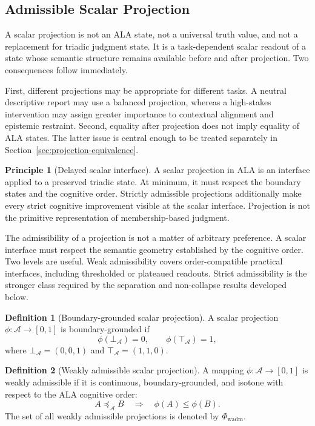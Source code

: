 \documentclass[reqno,final]{amsart}
\theoremstyle{definition}
\newtheorem{definition}{Definition}
\newtheorem{principle}{Principle}
\theoremstyle{plain}
\theoremstyle{remark}
\providecommand{\cA}{\mathcal{A}}
\providecommand{\cPhi}{\Phi}
\providecommand{\preceqA}{\preceq_{\mathcal A}}
\begin{document}
\subsection{Admissible Scalar Projection}
A scalar projection is not an ALA state, not a universal truth value, and not a replacement for triadic judgment state. It is a task-dependent scalar readout of a state whose semantic structure remains available before and after projection. Two consequences follow immediately.

First, different projections may be appropriate for different tasks. A neutral descriptive report may use a balanced projection, whereas a high-stakes intervention may assign greater importance to contextual alignment and epistemic restraint. Second, equality after projection does not imply equality of ALA states. The latter issue is central enough to be treated separately in Section~\ref{sec:projection-equivalence}.

\begin{principle}[Delayed scalar interface]
A scalar projection in ALA is an interface applied to a preserved triadic state. At minimum, it must respect the boundary states and the cognitive order. Strictly admissible projections additionally make every strict cognitive improvement visible at the scalar interface. Projection is not the primitive representation of membership-based judgment.
\end{principle}

The admissibility of a projection is not a matter of arbitrary preference. A scalar interface must respect the semantic geometry established by the cognitive order. Two levels are useful. Weak admissibility covers order-compatible practical interfaces, including thresholded or plateaued readouts. Strict admissibility is the stronger class required by the separation and non-collapse results developed below.

\begin{definition}[Boundary-grounded scalar projection]
A scalar projection \(\phi:\cA\to[0,1]\) is boundary-grounded if
\[
\phi(\bot_{\cA})=0,
\qquad
\phi(\top_{\cA})=1,
\]
where \(\bot_{\cA}=(0,0,1)\) and \(\top_{\cA}=(1,1,0)\).
\end{definition}

\begin{definition}[Weakly admissible scalar projection]
A mapping \(\phi:\cA\to[0,1]\) is weakly admissible if it is continuous, boundary-grounded, and isotone with respect to the ALA cognitive order:
\[
A\preceqA B
\quad\Longrightarrow\quad
\phi(A)\leq\phi(B).
\]
The set of all weakly admissible projections is denoted by
\(\cPhi_{\mathrm{wadm}}\).
\end{definition}
\end{document}
